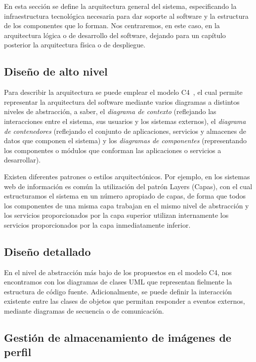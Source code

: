 En esta sección se define la arquitectura general del sistema, especificando la infraestructura tecnológica necesaria para dar soporte al software y la estructura de los componentes que lo forman. Nos centraremos, en este caso, en la arquitectura lógica o de desarrollo del software, dejando para un capítulo posterior la arquitectura física o de despliegue. 

\subsection{Diseño de alto nivel}
Para describir la arquitectura se puede emplear el modelo C4~\cite{c4model}, el cual permite representar la arquitectura del software mediante varios diagramas a distintos niveles de abstracción, a saber, el \textit{diagrama de contexto} (reflejando las interacciones entre el sistema, sus usuarios y los sistemas externos), el \textit{diagrama de contenedores} (reflejando el conjunto de aplicaciones, servicios y almacenes de datos que componen el sistema) y los \textit{diagramas de componentes} (representando los componentes o módulos que conforman las aplicaciones o servicios a desarrollar).

Existen diferentes patrones o estilos arquitectónicos. Por ejemplo, en los sistemas web de información es común la utilización del patrón Layers (Capas), con el cual estructuramos el sistema en un número apropiado de capas, de forma que todos los componentes de una misma capa trabajan en el mismo nivel de abstracción y los servicios proporcionados por la capa superior utilizan internamente los servicios proporcionados por la capa inmediatamente inferior. 

\subsection{Diseño detallado}
En el nivel de abstracción más bajo de los propuestos en el modelo C4, nos encontramos con los diagramas de clases UML que representan fielmente la estructura de código fuente. Adicionalmente, se puede definir la interacción existente entre las clases de objetos que permitan responder a eventos externos, mediante diagramas de secuencia o de comunicación.

\subsection{Gestión de almacenamiento de imágenes de perfil}
\label{sec:storageDesign}
